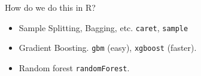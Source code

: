 \documentclass[xcolor=pdftex,dvipsnames,table,mathserif]{beamer}
\begin{document}
\begin{frame}{How do we do this in R?}
\begin{itemize}
\item Sample Splitting, Bagging, etc. \texttt{caret}, \texttt{sample}
\item Gradient Boosting. \texttt{gbm} (easy), \texttt{xgboost} (faster).
\item Random forest \texttt{randomForest}.
\end{itemize}
\end{frame}
\end{document}
